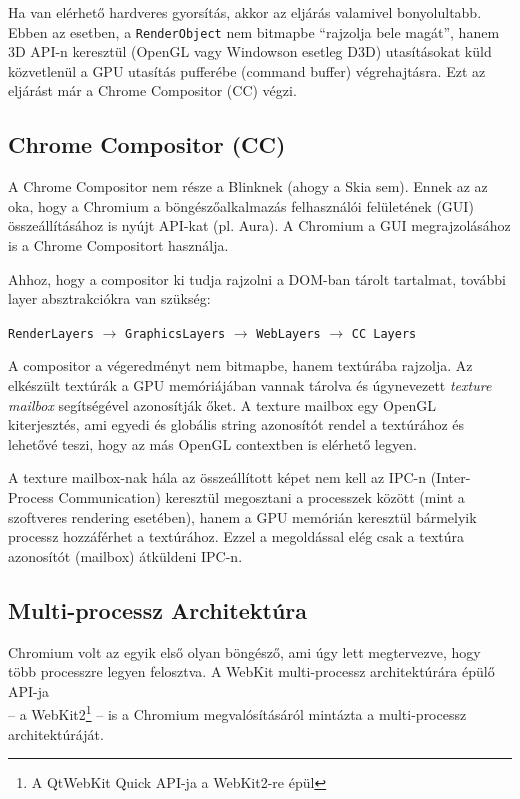 \documentclass[12pt]{report}
\begin{document}
Ha van elérhető hardveres gyorsítás, akkor az eljárás valamivel bonyolultabb. Ebben az
esetben, a \texttt{RenderObject} nem bitmapbe ``rajzolja bele magát'', hanem 3D API-n
keresztül (OpenGL vagy Windowson esetleg D3D) utasításokat küld közvetlenül a GPU
utasítás pufferébe (command buffer) végrehajtásra. Ezt az eljárást már a
Chrome Compositor (CC) végzi.
\cite{bib:chromium-gpu, bib:chromium-oopifs}

\subsection{Chrome Compositor (CC)}
A Chrome Compositor nem része a Blinknek (ahogy a Skia sem). Ennek az az oka,
hogy a Chromium a böngészőalkalmazás felhasználói felületének (GUI) összeállításához is
nyújt API-kat (pl. Aura). A Chromium a GUI megrajzolásához is a Chrome Compositort
használja.

Ahhoz, hogy a compositor ki tudja rajzolni a DOM-ban tárolt tartalmat, további layer
absztrakciókra van szükség:
\begin{center}
    \texttt{RenderLayers} $\rightarrow$ \texttt{GraphicsLayers} $\rightarrow$
    \texttt{WebLayers} $\rightarrow$ \texttt{CC Layers}
\end{center}
A compositor a végeredményt nem bitmapbe, hanem textúrába rajzolja. Az elkészült
textúrák a GPU memóriájában vannak tárolva és úgynevezett \textit{texture mailbox}
segítségével azonosítják őket.
A texture mailbox egy OpenGL kiterjesztés, ami egyedi és globális
string azonosítót rendel a textúrához és lehetővé teszi, hogy az más OpenGL contextben
is elérhető legyen.
\cite{bib:chromium-gpu, bib:chromium-oopifs}

A texture mailbox-nak hála az összeállított képet nem kell az IPC-n (Inter-Process
Communication) keresztül megosztani a processzek között (mint a szoftveres rendering
esetében), hanem a GPU memórián keresztül bármelyik processz hozzáférhet a textúrához.
Ezzel a megoldással elég csak a textúra azonosítót (mailbox) átküldeni IPC-n.
\cite{bib:chromium-texture-mailbox}

\subsection{Multi-processz Architektúra}
Chromium volt az egyik első olyan böngésző, ami úgy lett megtervezve, hogy több processzre
legyen felosztva. A WebKit multi-processz architektúrára épülő API-ja \\
-- a WebKit2\footnote{A QtWebKit Quick API-ja a WebKit2-re épül} --
is a Chromium megvalósításáról mintázta a multi-processz architektúráját.
\cite{bib:webkit-webkit2}
\end{document}
